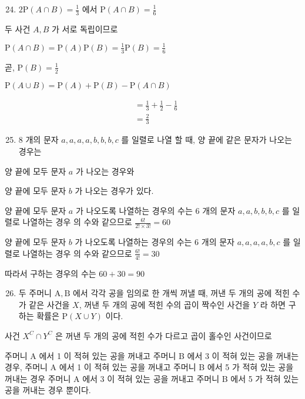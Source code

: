 \documentclass[10pt]{article}
\begin{document}
\begin{enumerate}
  \setcounter{enumi}{23}
  \item \(2 \mathrm{P}(A \cap B)=\frac{1}{3}\) 에서 \(\mathrm{P}(A \cap B)=\frac{1}{6}\)
\end{enumerate}

두 사건 \(A, B\) 가 서로 독립이므로

\(\mathrm{P}(A \cap B)=\mathrm{P}(A) \mathrm{P}(B)=\frac{1}{3} \mathrm{P}(B)=\frac{1}{6}\)

곧, \(\mathrm{P}(B)=\frac{1}{2}\)

\(\mathrm{P}(A \cup B)=\mathrm{P}(A)+\mathrm{P}(B)-\mathrm{P}(A \cap B)\)

\[
\begin{aligned}
& =\frac{1}{3}+\frac{1}{2}-\frac{1}{6} \\
& =\frac{2}{3}
\end{aligned}
\]

\begin{enumerate}
  \setcounter{enumi}{24}
  \item 8 개의 문자 \(a, a, a, a, b, b, b, c\) 를 일렬로 나열 할 때, 양 끝에 같은 문자가 나오는 경우는
\end{enumerate}

양 끝에 모두 문자 \(a\) 가 나오는 경우와

양 끝에 모두 문자 \(b\) 가 나오는 경우가 있다.

양 끝에 모두 문자 \(a\) 가 나오도록 나열하는 경우의 수는 6 개의 문자 \(a, a, b, b, b, c\) 를 일렬로 나열하는 경우 의 수와 같으므로 \(\frac{6!}{2!\times 3!}=60\)

양 끝에 모두 문자 \(b\) 가 나오도록 나열하는 경우의 수는 6 개의 문자 \(a, a, a, a, b, c\) 를 일렬로 나열하는 경우 의 수와 같으므로 \(\frac{6!}{4!}=30\)

따라서 구하는 경우의 수는 \(60+30=90\)

\begin{enumerate}
  \setcounter{enumi}{25}
  \item 두 주머니 \(\mathrm{A}, \mathrm{B}\) 에서 각각 공을 임의로 한 개씩 꺼낼 때, 꺼낸 두 개의 공에 적힌 수가 같은 사건을 \(X\), 꺼낸 두 개의 공에 적힌 수의 곱이 짝수인 사건을 \(Y\) 라 하면 구하는 확률은 \(\mathrm{P}(X \cup Y)\) 이다.
\end{enumerate}

사건 \(X^{C} \cap Y^{C}\) 은 꺼낸 두 개의 공에 적힌 수가 다르고 곱이 홀수인 사건이므로

주머니 A 에서 1 이 적혀 있는 공을 꺼내고 주머니 B 에서 3 이 적혀 있는 공을 꺼내는 경우, 주머니 A 에서 1 이 적혀 있는 공을 꺼내고 주머니 B 에서 5 가 적혀 있는 공을 꺼내는 경우 주머니 A 에서 3 이 적혀 있는 공을 꺼내고 주머니 B 에서 5 가 적혀 있는 공을 꺼내는 경우 뿐이다.
\end{document}
